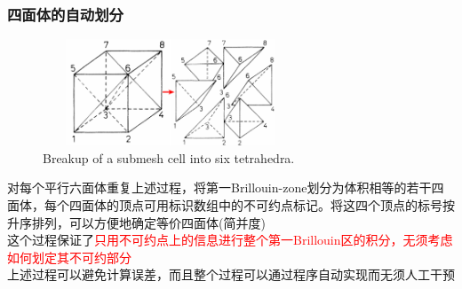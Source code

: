 \documentclass[cjk,slidestop,compress,mathserif,blue]{beamer}
\begin{document}
\frame
{
	\frametitle{四面体的自动划分}
\begin{figure}[h!]
\centering
\vspace*{-0.28in}
\includegraphics[height=1.25in,width=3.00in,viewport=0 0 1350 705,clip]{Figures/submesh_Tetra.png}
\caption{\tiny Breakup of a submesh cell into six tetrahedra.}%
\label{Fig:Submesh_Tetra}
\end{figure}
对每个平行六面体重复上述过程，将第一\textrm{Brillouin-zone}划分为体积相等的若干四面体，每个四面体的顶点可用标识数组中的不可约点标记。将这四个顶点的标号按升序排列，可以方便地确定等价四面体(简并度)\\
这个过程保证了\textcolor{red}{只用不可约点上的信息进行整个第一\textrm{Brillouin}区的积分，无须考虑如何划定其不可约部分}\\
上述过程可以避免计算误差，而且整个过程可以通过程序自动实现而无须人工干预
}
\end{document}
